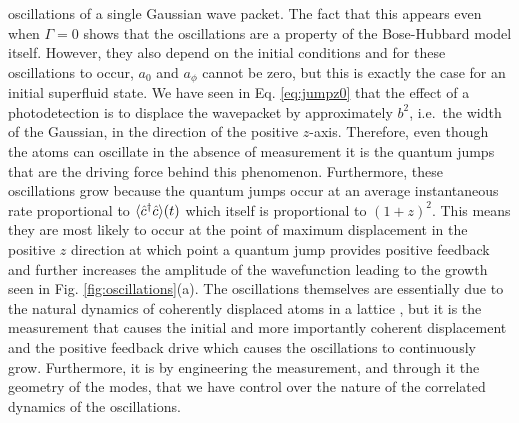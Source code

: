 oscillations of a single Gaussian wave packet. The fact that this
appears even when $\Gamma = 0$ shows that the oscillations are a
property of the Bose-Hubbard model itself. However, they also depend
on the initial conditions and for these oscillations to occur, $a_0$
and $a_\phi$ cannot be zero, but this is exactly the case for an
initial superfluid state. We have seen in Eq. \eqref{eq:jumpz0} that
the effect of a photodetection is to displace the wavepacket by
approximately $b^2$, i.e.~the width of the Gaussian, in the direction
of the positive $z$-axis. Therefore, even though the atoms can
oscillate in the absence of measurement it is the quantum jumps that
are the driving force behind this phenomenon. Furthermore, these
oscillations grow because the quantum jumps occur at an average
instantaneous rate proportional to $\langle \hat{c}^\dagger \hat{c} \rangle (t)$ which
itself is proportional to $(1+z)^2$. This means they are most likely
to occur at the point of maximum displacement in the positive $z$
direction at which point a quantum jump provides positive feedback and
further increases the amplitude of the wavefunction leading to the
growth seen in Fig. \ref{fig:oscillations}(a). The oscillations
themselves are essentially due to the natural dynamics of coherently
displaced atoms in a lattice , but it is the measurement that causes
the initial and more importantly coherent displacement and the
positive feedback drive which causes the oscillations to continuously
grow. Furthermore, it is by engineering the measurement, and through
it the geometry of the modes, that we have control over the nature of
the correlated dynamics of the oscillations.

